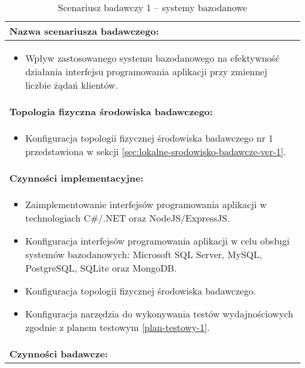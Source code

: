 \setlength{\LTcapwidth}{\textwidth}
\setlength\LTleft{0pt}
\setlength\LTright{0pt}
\begin{longtable}[c]{|llll|}
    \caption{Scenariusz badawczy 1 -- systemy bazodanowe}
    \label{tab:research-scenario-1}                                                  \\ \hline
    \multicolumn{4}{|l|}{\textbf{Nazwa scenariusza badawczego:}}                     \\ \hline
    \multicolumn{4}{|p{\linewidth}|}{
        \begin{itemize}[label={}]
            \item Wpływ zastosowanego systemu bazodanowego na efektywność działania interfejsu programowania aplikacji przy zmiennej liczbie żądań klientów.
          \end{itemize}
    } \\ \hline
    \multicolumn{4}{|l|}{\textbf{Topologia fizyczna środowiska badawczego:}}         \\ \hline
    \multicolumn{4}{|p{\linewidth}|}{
        \begin{itemize}[label={}]
            \item Konfiguracja topologii fizycznej środowiska badawczego nr 1 przedstawiona w sekcji \ref{sec:lokalne-srodowisko-badawcze-ver-1}.
          \end{itemize}
    }\\ \hline
    \multicolumn{4}{|l|}{\textbf{Czynności implementacyjne:}}                        \\ \hline
    \multicolumn{4}{|p{\linewidth}|}{
        \begin{itemize}
            \item Zaimplementowanie interfejsów programowania aplikacji w technologiach C\#/.NET oraz NodeJS/ExpressJS.
            \item Konfiguracja interfejsów programowania aplikacji w celu obsługi systemów bazodanowych: Microsoft SQL Server, MySQL, PostgreSQL, SQLite oraz MongoDB.
            \item Konfiguracja topologii fizycznej środowiska badawczego.
            \item Konfiguracja narzędzia do wykonywania testów wydajnościowych zgodnie z planem testowym \ref{plan-testowy-1}.
        \end{itemize}}                                                           \\ \hline
    \multicolumn{4}{|l|}{\textbf{Czynności badawcze:}}                               \\ \hline

\end{longtable}
